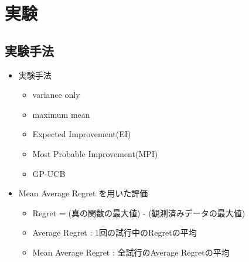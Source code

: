 \documentclass[dvipdfmx, 10.5pt]{beamer}
\begin{document}

\section{実験}



\subsection{実験手法}
\begin{frame}{\insertsubsection}
	\begin{itemize}
		\item 実験手法
		\begin{itemize}
			\item variance only
			\item maximum mean
			\item Expected Improvement(EI)
			\item Most Probable Improvement(MPI)
			\item GP-UCB
		\end{itemize}
		\item \alert{Mean Average Regret} を用いた評価
		\begin{itemize}
			\item Regret = (真の関数の最大値) - (観測済みデータの最大値)
			\item Average Regret : 1回の試行中のRegretの平均
			\item Mean Average Regret : 全試行のAverage Regretの平均
		\end{itemize}
	\end{itemize}
\end{frame}

\end{document}
